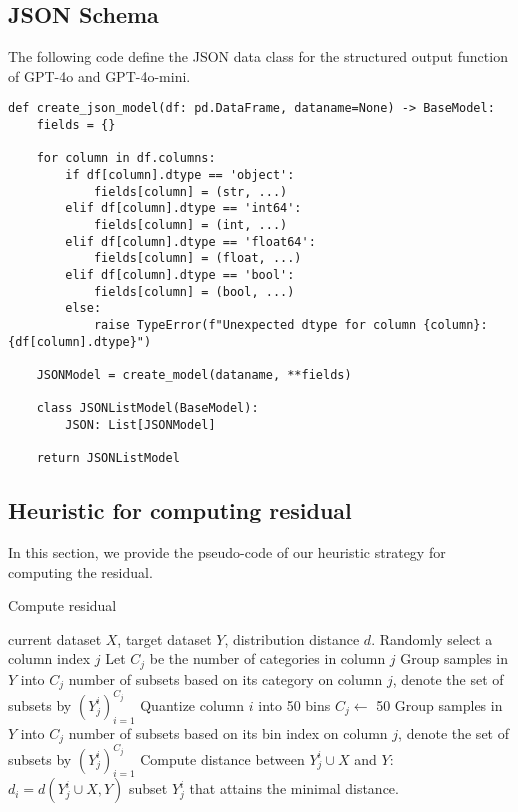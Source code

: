 \subsection{JSON Schema} \label{lst:json}
The following code define the JSON data class for the structured output function of GPT-4o and GPT-4o-mini.
\begin{lstlisting}
def create_json_model(df: pd.DataFrame, dataname=None) -> BaseModel:
    fields = {}
    
    for column in df.columns:
        if df[column].dtype == 'object':  
            fields[column] = (str, ...)
        elif df[column].dtype == 'int64':
            fields[column] = (int, ...)
        elif df[column].dtype == 'float64':
            fields[column] = (float, ...)
        elif df[column].dtype == 'bool':
            fields[column] = (bool, ...)
        else:
            raise TypeError(f"Unexpected dtype for column {column}: {df[column].dtype}")
    
    JSONModel = create_model(dataname, **fields)
    
    class JSONListModel(BaseModel):
        JSON: List[JSONModel]

    return JSONListModel
\end{lstlisting}

\subsection{Heuristic for computing residual}
In this section, we provide the pseudo-code of our heuristic strategy for computing the residual.
\begin{algorithm}
\caption{Compute residual \label{appendix:res_alg}}
\begin{algorithmic}[1]
\Require current dataset $X$, target dataset $Y$, distribution distance $d$.
\State Randomly select a column index $j$
    \State Let $C_j$ be the number of categories in column $j$
    \State Group samples in $Y$ into $C_j$ number of subsets based on its category on column $j$, denote the set of subsets by $(Y_j^i)_{i=1}^{C_j}$
\Else
    \State Quantize column $i$ into 50 bins
    \State $C_j\leftarrow$ 50
    \State Group samples in $Y$ into $C_j$ number of subsets based on its bin index on column $j$, denote the set of subsets by $(Y_j^i)_{i=1}^{C_j}$
\EndIf
{} 
    \State Compute distance between $Y_j^i \cup X$ and $Y$: $d_i = d(Y_j^i \cup X, Y)$
\EndFor
\State \Return subset $Y_j^i$ that attains the minimal distance.
\end{algorithmic}
\end{algorithm}

